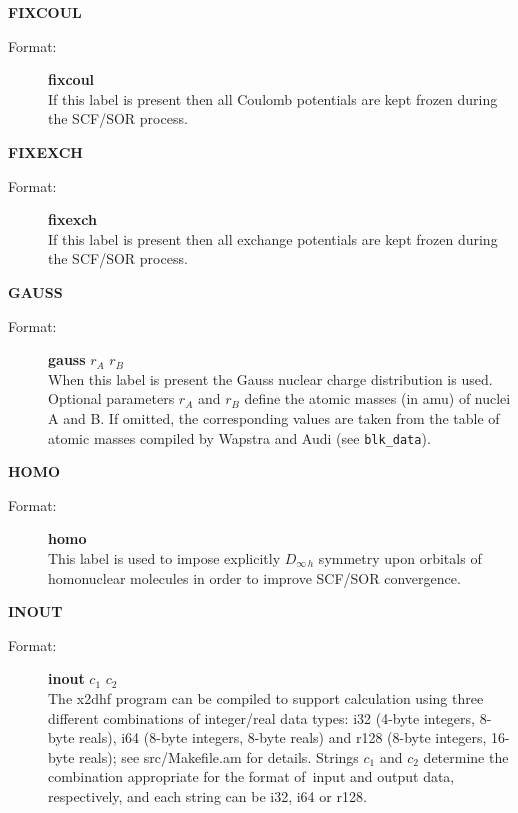 \documentclass[12pt,a4paper]{article}
\newcommand{\ft}[1]{\texttt{#1}}
\begin{document}
\begin{description}
\begin{description}
\end{description}  

\item \textbf{FIXCOUL}
\begin{description} 
\item[Format:] \textbf{fixcoul}\\ If this label is present then all
  Coulomb potentials are kept frozen during the SCF/SOR process.
\end{description}  

\item \textbf{FIXEXCH}
\begin{description} 
\item[Format:] \textbf{fixexch}\\ If this label is present then all
  exchange potentials are kept frozen during the SCF/SOR process.
\end{description}  


\item \textbf{GAUSS} 
\begin{description} 
\item[Format:] \textbf{gauss} $r_A$ $r_B$ \\ When this label is present the Gauss nuclear
  charge distribution is used. Optional parameters $r_A$ and $r_B$ define the atomic
  masses (in amu) of nuclei A and B. If omitted, the corresponding values are taken from
  the table of atomic masses compiled by Wapstra and Audi (see \ft{blk\_data}).
\end{description} 

\item \textbf{HOMO} 
\begin{description} 
\item[Format:] \textbf{homo}  \\
This label is used to impose explicitly $D_{\infty\,h}$ symmetry upon orbitals
of homonuclear molecules in order to improve SCF/SOR convergence.
\end{description} 


\item \textbf{INOUT} 
\begin{description} 
\item[Format:] \textbf{inout} $c_1$ $c_2$\\ The x2dhf program can be compiled to support
  calculation using three different combinations of integer/real data types: i32 (4-byte
  integers, 8-byte reals), i64 (8-byte integers, 8-byte reals) and r128 (8-byte integers,
  16-byte reals); see src/Makefile.am for details.  Strings $c_1$ and $c_2$ determine the
  combination appropriate for the format of~input and output data, respectively, and each
  string can be i32, i64 or r128.


\end{description}
\end{description}
\end{document}
